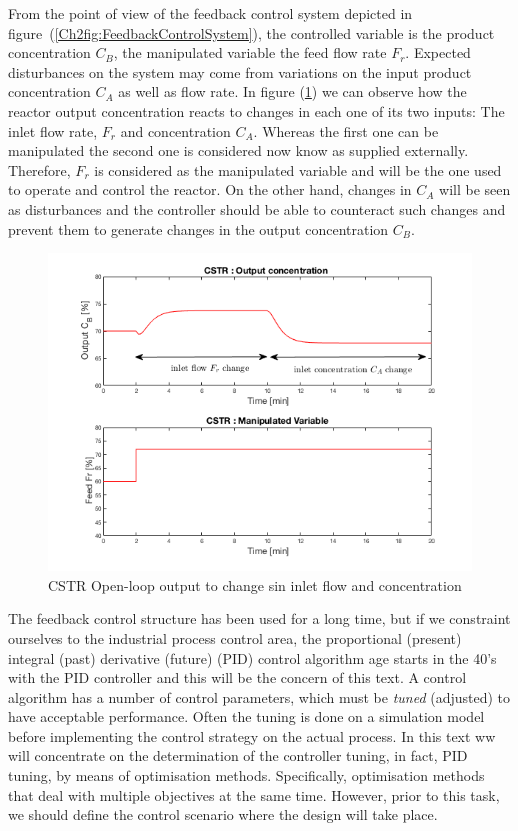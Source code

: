 From the point of view of the feedback control system depicted in figure~(\ref{Ch2fig:FeedbackControlSystem}), the controlled variable is the product concentration $C_B$, the manipulated variable  the feed flow rate $F_r$. Expected disturbances on the system  may come from variations on the input product concentration $C_A$ as well as flow rate. In figure (\ref{Ch2fig:CSTRFigureOpenLoop}) we can observe how the reactor output concentration reacts to changes in each one of its two inputs: The inlet flow rate, $F_r$ and concentration $C_A$. Whereas the first one can be manipulated the second one is considered now know as supplied externally. Therefore, $F_r$ is considered as the manipulated variable and will be the one used to operate and control the reactor. On the other hand, changes in $C_A$ will be seen as disturbances and the controller should be able to counteract such changes and prevent them to generate changes in the output concentration $C_B$. 
%
\begin{figure}[tb]
\centering
\includegraphics[width=\linewidth]{../figuras/Ch2FigureOpenLoop}
\caption{CSTR Open-loop output to change sin inlet flow and concentration} 
\label{Ch2fig:CSTRFigureOpenLoop}
\end{figure}

The feedback control structure has been used for a long time, but if we constraint ourselves to the industrial process control area, the proportional (present) integral (past) derivative (future) (PID) control algorithm age starts in the 40's  with the PID controller and this will be the concern of this text.  A control algorithm has a number of control parameters, which must be \emph{tuned} (adjusted) to have acceptable performance. Often the tuning is done on a simulation model before implementing the control strategy on the actual process. In this text ww will concentrate on the determination of the controller tuning, in fact, PID tuning, by means of optimisation methods. Specifically, optimisation methods that deal with multiple objectives at the same time. However, prior to this task, we should define the control scenario where the design will take place.

